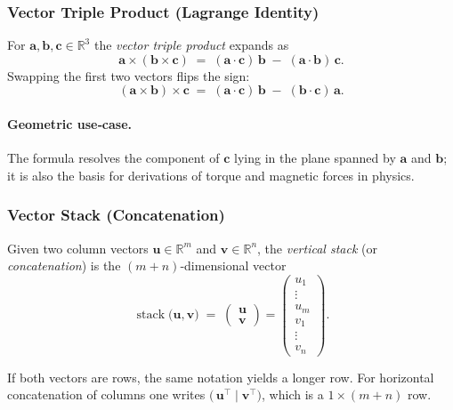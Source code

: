 \subsubsection{Vector Triple Product (Lagrange Identity)}
For $\mathbf{a},\mathbf{b},\mathbf{c}\in\mathbb{R}^3$ the \emph{vector triple product}
expands as
\[
  \mathbf{a}\times(\mathbf{b}\times\mathbf{c})
  \;=\;
  (\mathbf{a}\cdot\mathbf{c})\,\mathbf{b}
  \;-\;
  (\mathbf{a}\cdot\mathbf{b})\,\mathbf{c}.
\]
Swapping the first two vectors flips the sign:
\[
  (\mathbf{a}\times\mathbf{b})\times\mathbf{c}
  \;=\;
  (\mathbf{a}\cdot\mathbf{c})\,\mathbf{b}
  \;-\;
  (\mathbf{b}\cdot\mathbf{c})\,\mathbf{a}.
\]

\paragraph{Geometric use‑case.}  
The formula resolves the component of $\mathbf{c}$ lying in the plane
spanned by $\mathbf{a}$ and $\mathbf{b}$; it is also the basis
for derivations of torque and magnetic forces in physics.

\subsubsection{Vector Stack (Concatenation)}
Given two column vectors 
$\mathbf{u}\in\mathbb{R}^{m}$ and $\mathbf{v}\in\mathbb{R}^{n}$, the \emph{vertical stack}
(or \emph{concatenation}) is the $(m+n)$‑dimensional vector  
\[
  \operatorname{stack}\!\bigl(\mathbf{u},\mathbf{v}\bigr)
  \;=\;
  \begin{pmatrix}
      \mathbf{u} \\[4pt] \mathbf{v}
  \end{pmatrix}
  =
  \begin{pmatrix}
      u_1 \\ \vdots \\ u_m \\ v_1 \\ \vdots \\ v_n
  \end{pmatrix}.
\]

\noindent
If both vectors are rows, the same notation yields a longer row.  
For horizontal concatenation of columns one writes  
$\bigl(\,\mathbf{u}^\top\!\mid\!\mathbf{v}^\top\bigr)$, which is a $1\times(m+n)$ row.

